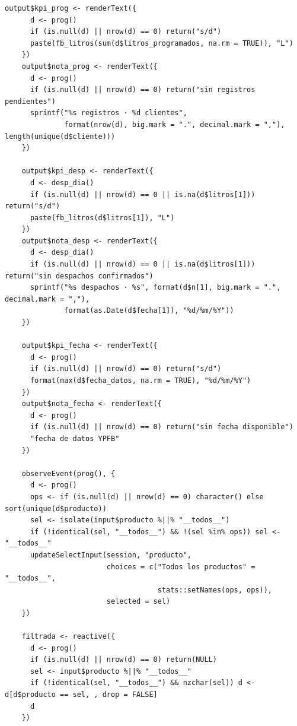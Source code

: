 \begin{lstlisting}[style=anexoR]
    output$kpi_prog <- renderText({
      d <- prog()
      if (is.null(d) || nrow(d) == 0) return("s/d")
      paste(fb_litros(sum(d$litros_programados, na.rm = TRUE)), "L")
    })
    output$nota_prog <- renderText({
      d <- prog()
      if (is.null(d) || nrow(d) == 0) return("sin registros pendientes")
      sprintf("%s registros · %d clientes",
              format(nrow(d), big.mark = ".", decimal.mark = ","), length(unique(d$cliente)))
    })

    output$kpi_desp <- renderText({
      d <- desp_dia()
      if (is.null(d) || nrow(d) == 0 || is.na(d$litros[1])) return("s/d")
      paste(fb_litros(d$litros[1]), "L")
    })
    output$nota_desp <- renderText({
      d <- desp_dia()
      if (is.null(d) || nrow(d) == 0 || is.na(d$litros[1])) return("sin despachos confirmados")
      sprintf("%s despachos · %s", format(d$n[1], big.mark = ".", decimal.mark = ","),
              format(as.Date(d$fecha[1]), "%d/%m/%Y"))
    })

    output$kpi_fecha <- renderText({
      d <- prog()
      if (is.null(d) || nrow(d) == 0) return("s/d")
      format(max(d$fecha_datos, na.rm = TRUE), "%d/%m/%Y")
    })
    output$nota_fecha <- renderText({
      d <- prog()
      if (is.null(d) || nrow(d) == 0) return("sin fecha disponible")
      "fecha de datos YPFB"
    })

    observeEvent(prog(), {
      d <- prog()
      ops <- if (is.null(d) || nrow(d) == 0) character() else sort(unique(d$producto))
      sel <- isolate(input$producto %||% "__todos__")
      if (!identical(sel, "__todos__") && !(sel %in% ops)) sel <- "__todos__"
      updateSelectInput(session, "producto",
                        choices = c("Todos los productos" = "__todos__",
                                    stats::setNames(ops, ops)),
                        selected = sel)
    })

    filtrada <- reactive({
      d <- prog()
      if (is.null(d) || nrow(d) == 0) return(NULL)
      sel <- input$producto %||% "__todos__"
      if (!identical(sel, "__todos__") && nzchar(sel)) d <- d[d$producto == sel, , drop = FALSE]
      d
    })


\end{lstlisting}
